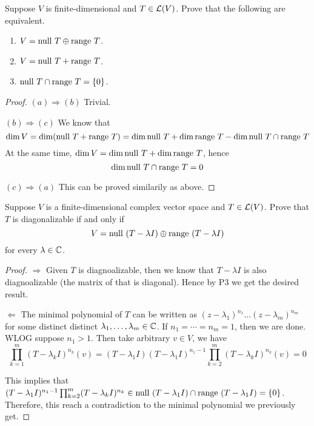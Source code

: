 \documentclass{extarticle}
\begin{document}
\begin{problem}{4}
    Suppose \(V\) is finite-dimensional and \(T \in \mathcal{L}(V)\). Prove that the following are equivalent.
    \begin{enumerate}[label=(\alph*)]
        \item \(V = \text{null } T \oplus \text{range } T\). 
        \item \(V = \text{null } T + \text{range } T\). 
        \item \(\text{null } T \cap \text{range } T = \{0\}\).
    \end{enumerate}
\end{problem}


\begin{proof}
\((a) \Rightarrow (b)\) Trivial. 

\((b) \Rightarrow (c)\) We know that 
\[\dim V = \dim (\text{null } T  + \text{range } T) = \dim \text{null } T + \dim \text{range } T - \dim \text{null } T \cap \text{range } T\]
At the same time, \(\dim V = \dim \text{null } T + \dim \text{range } T\), hence 
\[\dim \text{null } T \cap \text{range } T = 0\]

\((c) \Rightarrow (a)\) This can be proved similarily as above. 
\end{proof}


\begin{problem}{5}
    Suppose \(V\) is a finite-dimensional complex vector space and \(T \in \mathcal{L}(V)\). Prove that 
    \(T\) is diagonalizable if and only if 
    \[V= \text{null } (T - \lambda I) \oplus \text{range } (T - \lambda I)\]
    for every \(\lambda \in \mathbb{C}\).
\end{problem}

\begin{proof}
\(\Rightarrow\) Given \(T\) is diagnoalizable, then we know that \(T - \lambda I\) is also 
diagnoalizable (the matrix of that is diagonal). Hence by P3 we get the desired result. 

\(\Leftarrow\) The minimal polynomial of \(T\) can be written as 
\((z - \lambda_1)^{n_1}\ldots(z - \lambda_m)^{n_m}\) for some distinct distinct \(\lambda_1, \ldots, 
\lambda_m \in \mathbb{C}\). If \(n_1 = \cdots = n_m = 1\), then we are done. WLOG suppose \(n_1 > 1\). Then take 
arbitrary \(v \in V\), we have 
\[\prod_{k=1}^m (T - \lambda_k I)^{n_k} (v) = (T - \lambda_1 I)(T - \lambda_1 I)^{n_1 - 1} 
\prod_{k=2}^m (T - \lambda_k I)^{n_k}(v) = 0\]

This implies that \((T - \lambda_1 I)^{n_1 - 1} \prod_{k=2}^m (T - \lambda_k I)^{n_k} \in \text{null } (T - \lambda_1 I) 
\cap \text{range } (T - \lambda_1 I) = \{0\}\). Therefore, this reach a contradiction to the minimal polynomial we 
previously get.

\end{proof}
\end{document}
